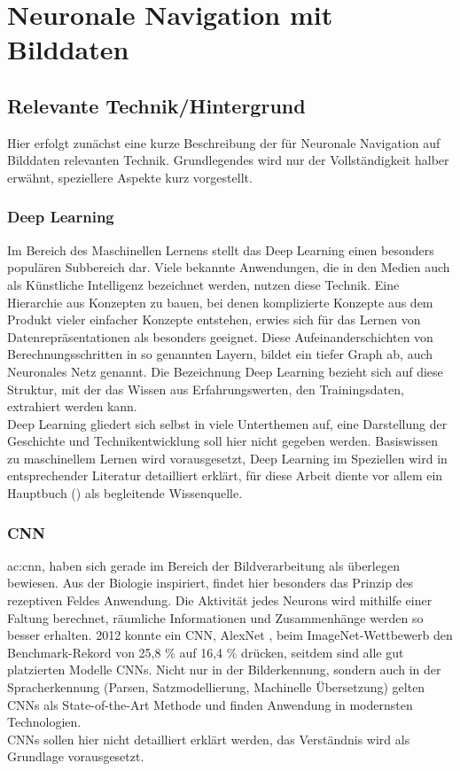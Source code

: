 
%
\chapter{Neuronale Navigation mit Bilddaten}

\section{Relevante Technik/Hintergrund}
Hier erfolgt zunächst eine kurze Beschreibung der für Neuronale Navigation auf Bilddaten relevanten Technik. Grundlegendes wird nur der Vollständigkeit halber erwähnt, speziellere Aspekte kurz vorgestellt. 

\subsection{Deep Learning}
Im Bereich des Maschinellen Lernens stellt das Deep Learning einen besonders populären Subbereich dar. Viele bekannte Anwendungen, die in den Medien auch als Künstliche Intelligenz bezeichnet werden, nutzen diese Technik. Eine Hierarchie aus Konzepten zu bauen, bei denen komplizierte Konzepte aus dem Produkt vieler einfacher Konzepte entstehen, erwies sich für das Lernen von Datenrepräsentationen als besonders geeignet. Diese Aufeinanderschichten von Berechnungsschritten in so genannten Layern, bildet ein tiefer Graph ab, auch Neuronales Netz genannt. Die Bezeichnung Deep Learning bezieht sich auf diese Struktur, mit der das Wissen aus Erfahrungswerten, den Trainingsdaten, extrahiert werden kann.\\
Deep Learning gliedert sich selbst in viele Unterthemen auf, eine Darstellung der Geschichte und Technikentwicklung soll hier nicht gegeben werden. Basiswissen zu maschinellem Lernen wird vorausgesetzt, Deep Learning im Speziellen wird in entsprechender Literatur detailliert erklärt, für diese Arbeit diente vor allem ein Hauptbuch (\cite{Goodfellow-et-al-2016}) als begleitende Wissenquelle.


\subsection{CNN}
\gls{ac:cnn}, haben sich gerade im Bereich der Bildverarbeitung als überlegen bewiesen. Aus der Biologie inspiriert, findet hier besonders das Prinzip des rezeptiven Feldes Anwendung. Die Aktivität jedes Neurons wird mithilfe einer Faltung berechnet, räumliche Informationen und Zusammenhänge werden so besser erhalten. 2012 konnte ein CNN, AlexNet \cite{krizhevsky2012imagenet}, beim ImageNet-Wettbewerb den Benchmark-Rekord von 25,8 \% auf 16,4 \% drücken, seitdem sind alle gut platzierten Modelle CNNs. Nicht nur in der Bilderkennung, sondern auch in der Spracherkennung (Parsen, Satzmodellierung, Machinelle Übersetzung) gelten CNNs als State-of-the-Art Methode und finden Anwendung in modernsten Technologien.\\
CNNs sollen hier nicht detailliert erklärt werden, das Verständnis wird als Grundlage vorausgesetzt.

